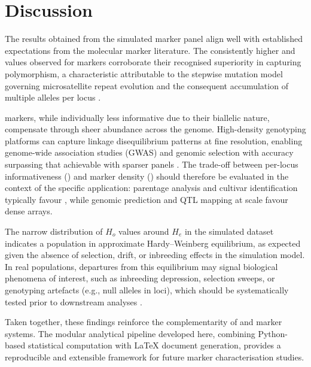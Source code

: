 
\section{Discussion}
\label{sec:discussion}

The results obtained from the simulated marker panel align well with
established expectations from the molecular marker literature. The
consistently higher \pic{} and \he{} values observed for \ssr{} markers
corroborate their recognised superiority in capturing polymorphism, a
characteristic attributable to the stepwise mutation model governing
microsatellite repeat evolution and the consequent accumulation of
multiple alleles per locus \autocite{Ellegren2004}.

\snp{} markers, while individually less informative due to their
biallelic nature, compensate through sheer abundance across the
genome. High-density \snp{} genotyping platforms can capture linkage
disequilibrium patterns at fine resolution, enabling genome-wide
association studies (GWAS) and genomic selection with accuracy
surpassing that achievable with sparser \ssr{} panels
\autocite{Goddard2007}. The trade-off between per-locus informativeness
(\ssr{}) and marker density (\snp{}) should therefore be evaluated in
the context of the specific application: parentage analysis and
cultivar identification typically favour \ssr{}, while genomic
prediction and QTL mapping at scale favour dense \snp{} arrays.

The narrow distribution of $H_o$ values around $H_e$ in the simulated
dataset indicates a population in approximate Hardy--Weinberg equilibrium,
as expected given the absence of selection, drift, or inbreeding effects
in the simulation model. In real populations, departures from this
equilibrium may signal biological phenomena of interest, such as
inbreeding depression, selection sweeps, or genotyping artefacts
(e.g., null alleles in \ssr{} loci), which should be systematically
tested prior to downstream analyses \autocite{Peakall2006}.

Taken together, these findings reinforce the complementarity of \snp{}
and \ssr{} marker systems. The modular analytical pipeline developed
here, combining Python-based statistical computation with \LaTeX{}
document generation, provides a reproducible and extensible framework
for future marker characterisation studies.

